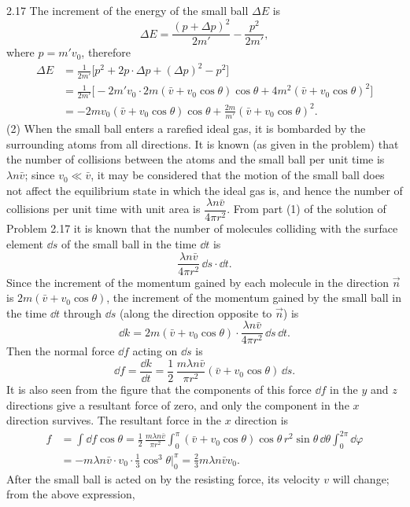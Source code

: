 \begin{solution}{2.17}
The increment of the energy of the small ball $\Delta E$ is
\[
\Delta E=\frac{(p+\Delta p)^2}{2m'}-\frac{p^2}{2m'},
\]
where $p=m'v_0$, therefore
\[
\begin{aligned}
\Delta E&=\frac{1}{2m'}\bigl[p^2+2p\cdot\Delta p+(\Delta p)^2-p^2\bigr]\\[2pt]
&=\frac{1}{2m'}\bigl[-2m'v_0\cdot2m(\bar{v}+v_0\cos\theta)\cos\theta+4m^2(\bar{v}+v_0\cos\theta)^2\bigr]\\[2pt]
&=-2mv_0(\bar{v}+v_0\cos\theta)\cos\theta+\frac{2m}{m'}(\bar{v}+v_0\cos\theta)^2.
\end{aligned}
\]
(2) When the small ball enters a rarefied ideal gas, it is bombarded by the surrounding atoms from all directions. It is known (as given in the problem) that the number of collisions between the atoms and the small ball per unit time is $\lambda n\bar{v}$; since $v_0\ll\bar{v}$, it may be considered that the motion of the small ball does not affect the equilibrium state in which the ideal gas is, and hence the number of collisions per unit time with unit area is $\dfrac{\lambda n\bar{v}}{4\pi r^2}$. From part (1) of the solution of Problem 2.17 it is known that the number of molecules colliding with the surface element $\dd s$ of the small ball in the time $\dd t$ is
\[
\frac{\lambda n\bar{v}}{4\pi r^2}\,\dd s\cdot\dd t.
\]
Since the increment of the momentum gained by each molecule in the direction $\vec{n}$ is $2m(\bar{v}+v_0\cos\theta)$, the increment of the momentum gained by the small ball in the time $\dd t$ through $\dd s$ (along the direction opposite to $\vec{n}$) is
\[
\dd k=2m(\bar{v}+v_0\cos\theta)\cdot\frac{\lambda n\bar{v}}{4\pi r^2}\,\dd s\,\dd t.
\]
Then the normal force $\dd f$ acting on $\dd s$ is
\[
\dd f=\frac{\dd k}{\dd t}=\frac{1}{2}\,\frac{m\lambda n\bar{v}}{\pi r^2}(\bar{v}+v_0\cos\theta)\,\dd s.
\]
It is also seen from the figure that the components of this force $\dd f$ in the $y$ and $z$ directions give a resultant force of zero, and only the component in the $x$ direction survives. The resultant force in the $x$ direction is
\[
\begin{aligned}
f&=\int \dd f\cos\theta
=\frac{1}{2}\,\frac{m\lambda n\bar{v}}{\pi r^2}\int_0^{\pi}(\bar{v}+v_0\cos\theta)\cos\theta\,r^2\sin\theta\,\dd\theta\int_0^{2\pi}\dd\varphi\\[2pt]
&=-m\lambda n\bar{v}\cdot v_0\cdot\frac{1}{3}\cos^3\theta\Big|_0^{\pi}
=\frac{2}{3}m\lambda n\bar{v}v_0.
\end{aligned}
\]
After the small ball is acted on by the resisting force, its velocity $v$ will change; from the above expression,

\end{solution}
